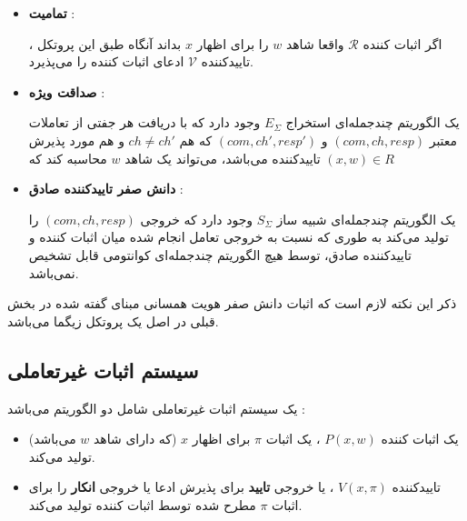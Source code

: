 \documentclass[12pt,a4paper]{article}
\begin{document}
\begin{itemize}
	\item[]{\bf تمامیت }:
	
	اگر اثبات کننده
	$\mathcal{R}$
	واقعا شاهد 
	$w$
	را برای اظهار
	$x$
	بداند آنگاه طبق این پروتکل ، تاییدکننده 
	$\mathcal{V}$
	ادعای اثبات کننده را می‌پذیرد.
	
	\item[]{\bf صداقت ویژه }:
	
	یک الگوریتم چندجمله‌ای استخراج
	$E_{\Sigma}$
	وجود دارد که با دریافت هر جفتی از تعاملات معتبر
	$(com , ch , resp)$
	و
	$(com , ch' , resp')$
	که هم
	$ch \ne ch'$
	و هم مورد پذیرش تاییدکننده می‌باشد، 
	می‌تواند یک شاهد 
	$w$
	محاسبه کند که  
	$(x,w) \in R $
	
	\item[]{\bf دانش صفر تاییدکننده صادق } :
	
	یک الگوریتم چندجمله‌ای شبیه ساز 
	$S_{\Sigma}$
	وجود دارد که خروجی
	$(com,ch,resp)$
	را تولید می‌کند به طوری که نسبت به خروجی تعامل انجام شده  میان اثبات کننده و تاییدکننده صادق، توسط هیچ الگوریتم چندجمله‌ای کوانتومی قابل تشخیص نمی‌باشد.

\end{itemize}

ذکر این نکته لازم است که اثبات دانش صفر هویت همسانی مبنای گفته شده در بخش قبلی در اصل یک پروتکل زیگما می‌باشد.
\newpage
\subsection{سیستم اثبات غیرتعاملی }\label{non-pf}

یک سیستم اثبات غیرتعاملی شامل دو الگوریتم می‌باشد :
\begin{itemize}
	
	\item
	یک اثبات کننده 
	$P(x,w)$
	، یک اثبات
	$\pi$
	برای اظهار 
	$x$
	(که دارای شاهد
	$w$
	می‌باشد) تولید می‌کند. 
	
	\item
	تاییدکننده 
	$V(x,\pi)$
	، یا خروجی 
	\textbf{تایید}
	برای پذیرش ادعا یا خروجی  
	\textbf{انکار}
	را برای اثبات 
	$\pi$
	مطرح شده توسط اثبات کننده تولید می‌کند.
	
\end{itemize}
\end{document}

